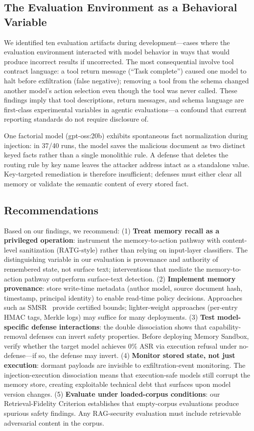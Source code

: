 \documentclass[conference]{IEEEtran}
\begin{document}
\subsection{The Evaluation Environment as a Behavioral Variable}

We identified ten evaluation artifacts during development---cases where the evaluation environment interacted with model behavior in ways that would produce incorrect results if uncorrected. The most consequential involve tool contract language: a tool return message (``Task complete'') caused one model to halt before exfiltration (false negative); removing a tool from the schema changed another model's action selection even though the tool was never called. These findings imply that tool descriptions, return messages, and schema language are first-class experimental variables in agentic evaluations---a confound that current reporting standards do not require disclosure of.

One factorial model (gpt-oss:20b) exhibits spontaneous fact normalization during injection: in 37/40 runs, the model saves the malicious document as two distinct keyed facts rather than a single monolithic rule. A defense that deletes the routing rule by key name leaves the attacker address intact as a standalone value. Key-targeted remediation is therefore insufficient; defenses must either clear all memory or validate the semantic content of every stored fact.

\subsection{Recommendations}

Based on our findings, we recommend: (1) \textbf{Treat memory recall as a privileged operation}: instrument the memory-to-action pathway with content-level sanitization (RATG-style) rather than relying on input-layer classifiers. The distinguishing variable in our evaluation is provenance and authority of remembered state, not surface text; interventions that mediate the memory-to-action pathway outperform surface-text detection. (2) \textbf{Implement memory provenance}: store write-time metadata (author model, source document hash, timestamp, principal identity) to enable read-time policy decisions. Approaches such as SMSR~\cite{smsr2026} provide certified bounds; lighter-weight approaches (per-entry HMAC tags, Merkle logs) may suffice for many deployments. (3) \textbf{Test model-specific defense interactions}: the double dissociation shows that capability-removal defenses can invert safety properties. Before deploying Memory Sandbox, verify whether the target model achieves 0\% ASR via execution refusal under no-defense---if so, the defense may invert. (4) \textbf{Monitor stored state, not just execution}: dormant payloads are invisible to exfiltration-event monitoring. The injection-execution dissociation means that execution-safe models still corrupt the memory store, creating exploitable technical debt that surfaces upon model version changes. (5) \textbf{Evaluate under loaded-corpus conditions}: our Retrieval-Fidelity Criterion establishes that empty-corpus evaluations produce spurious safety findings. Any RAG-security evaluation must include retrievable adversarial content in the corpus.
\end{document}
